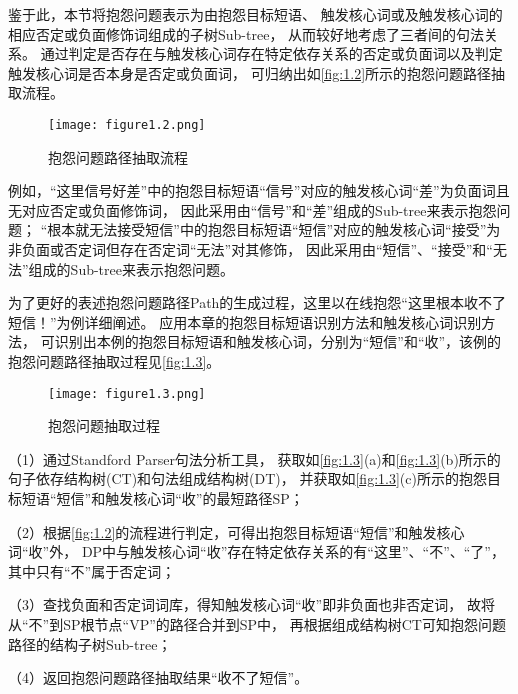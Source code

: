 鉴于此，本节将抱怨问题表示为由抱怨目标短语、
触发核心词或及触发核心词的相应否定或负面修饰词组成的子树Sub-tree，
从而较好地考虑了三者间的句法关系。
通过判定是否存在与触发核心词存在特定依存关系的否定或负面词以及判定触发核心词是否本身是否定或负面词，
可归纳出如\autoref{fig:1.2}所示的抱怨问题路径抽取流程。

\begin{figure}[th]
    
    \centering
    \texttt{[image: figure1.2.png]}
    \vskip -20pt
    \caption{抱怨问题路径抽取流程}\label{fig:1.2}
\end{figure}

例如，“这里信号好差”中的抱怨目标短语“信号”对应的触发核心词“差”为负面词且无对应否定或负面修饰词，
因此采用由“信号”和“差”组成的Sub-tree来表示抱怨问题；
“根本就无法接受短信”中的抱怨目标短语“短信”对应的触发核心词“接受”为非负面或否定词但存在否定词“无法”对其修饰，
因此采用由“短信”、“接受”和“无法”组成的Sub-tree来表示抱怨问题。

为了更好的表述抱怨问题路径Path的生成过程，这里以在线抱怨“这里根本收不了短信！”为例详细阐述。
应用本章的抱怨目标短语识别方法和触发核心词识别方法，
可识别出本例的抱怨目标短语和触发核心词，分别为“短信”和“收”，该例的抱怨问题路径抽取过程见\autoref{fig:1.3}。

\begin{figure}[th]
    
    \centering
    \texttt{[image: figure1.3.png]}
    \vskip -20pt
    \caption{抱怨问题抽取过程}\label{fig:1.3}
\end{figure}

（1）通过Standford Parser句法分析工具，
获取如\autoref{fig:1.3}(a)和\autoref{fig:1.3}(b)所示的句子依存结构树(CT)和句法组成结构树(DT)，
并获取如\autoref{fig:1.3}(c)所示的抱怨目标短语“短信”和触发核心词“收”的最短路径SP；

（2）根据\autoref{fig:1.2}的流程进行判定，可得出抱怨目标短语“短信”和触发核心词“收”外，
DP中与触发核心词“收”存在特定依存关系的有“这里”、“不”、“了”，其中只有“不”属于否定词；

（3）查找负面和否定词词库，得知触发核心词“收”即非负面也非否定词，
故将从“不”到SP根节点“VP”的路径合并到SP中，
再根据组成结构树CT可知抱怨问题路径的结构子树Sub-tree；

（4）返回抱怨问题路径抽取结果“收不了短信”。

